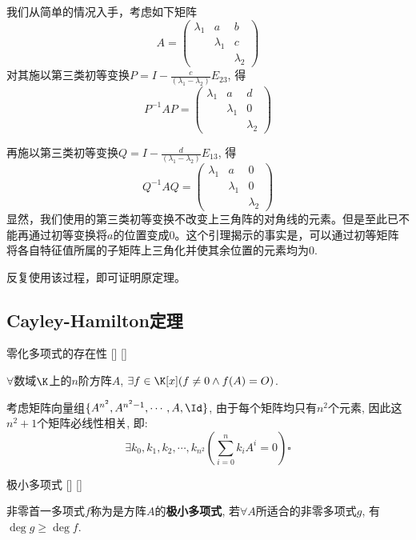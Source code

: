 \documentclass[UTF8]{ctexart}
\begin{document}
		\begin{prf}
			我们从简单的情况入手，考虑如下矩阵\[A=
			\begin{pmatrix}
				\lambda_1&a&b\\ &\lambda_1&c\\ &&\lambda_2
			\end{pmatrix}\]
			对其施以第三类初等变换$P=I-\displaystyle\frac{c}{(\lambda_1-\lambda_2)}E_{23} $, 得
			\[P^{-1}AP=
			\begin{pmatrix}
				\lambda_1&a&d\\ &\lambda_1&0\\ &&\lambda_2
			\end{pmatrix}\]
			
			再施以第三类初等变换$Q=I-\displaystyle\frac{d}{(\lambda_1-\lambda_2)}E_{13} $, 得
			\[Q^{-1}AQ=
			\begin{pmatrix}
				\lambda_1&a&0\\ &\lambda_1&0\\ &&\lambda_2
			\end{pmatrix}\]
			显然，我们使用的第三类初等变换不改变上三角阵的对角线的元素。但是至此已不能再通过初等变换将$a$的位置变成0。这个引理揭示的事实是，可以通过初等矩阵将各自特征值所属的子矩阵上三角化并使其余位置的元素均为0.

			反复使用该过程，即可证明原定理。
		\end{prf}
	
	\subsection{Cayley-Hamilton定理}
	
		
		\begin{thm}
			[]
			{零化多项式的存在性}
			[]
			[]

			$\forall$数域$\K$上的$n$阶方阵$A$, $\exists f\in\K[x](f\neq 0\wedge f(A)=O)$. 
		\end{thm}

		\begin{prf}

			考虑矩阵向量组$\{A^{n^2}, A^{n^2-1}, \cdots ,A,\Id\}$, 由于每个矩阵均只有$n^2$个元素, 因此这$n^2+1$个矩阵必线性相关, 即: 
			\[\exists k_0,k_1,k_2,\cdots,k_{n^2}(\sum_{i=0}^n k_i A^i=0)\square\]
		\end{prf}
		
		\begin{dfn}
			[]
			{极小多项式}
			[]
			[]

			非零首一多项式$f$称为是方阵$A$的\textbf{极小多项式}, 若$\forall A$所适合的非零多项式$g$, 有$\deg g\geq\deg f$. 
		\end{dfn}
		
\end{document}
